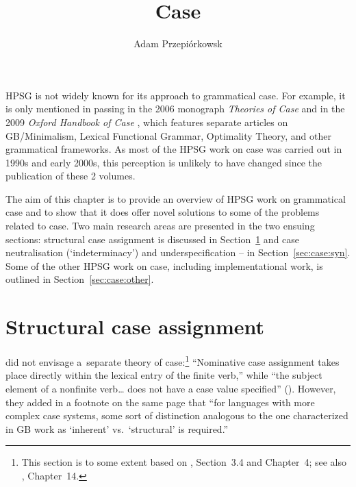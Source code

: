 \documentclass[output=paper]{langsci/langscibook}
\author{%
	Adam Przepiórkows­k\affiliation{Polish Academy of Sciences}%
}
\title{Case}
\begin{document}
\label{chap-case}

\maketitle{}

HPSG is not widely known for its approach to grammatical case.  For example, it is only mentioned in passing in the 2006 monograph \emph{Theories of Case} \citep[225]{butt:06} and in the 2009 \emph{Oxford Handbook of Case} \citep[43]{mal:spe:09}, which features separate articles on GB/Minimalism, Lexical Functional Grammar, Optimality Theory, and other grammatical frameworks.  As most of the HPSG work on case was carried out in 1990s and early 2000s, this perception is unlikely to have changed since the publication of these 2 volumes.

The aim of this chapter is to provide an overview of HPSG work on grammatical case and to show that it does offer novel solutions to some of the problems related to case.  Two main research areas are presented in the two ensuing sections: structural case assignment is discussed in Section~\ref{sec:case:str} and case neutralisation (`indeterminacy’) and underspecification – in Section~\ref{sec:case:syn}.  Some of the other HPSG work on case, including implementational work, is outlined in Section~\ref{sec:case:other}.  %


\section{Structural case assignment}
\label{sec:case:str}

\citet{ps2} did not envisage a~separate theory of case:\footnote{This section is to some extent based on \citealt{Prze99b}, Section~3.4 and Chapter~4; see also \citealt{MuellerLehrbuch3}, Chapter~14.} “Nominative case assignment takes place directly within the lexical entry of the finite verb,” while “the subject  element of a nonfinite verb… does not have a case value specified” ().  However, they added in a footnote on the same page that “for languages with more complex case systems, some sort of distinction analogous to the one characterized in GB work as `inherent’ vs.~`structural’ is required.”  
\end{document}
